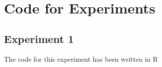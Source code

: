 
\chapter{Code for Experiments} %

\label{AppendixA} %

\section{Experiment 1}

The code for this experiment has been written in R
